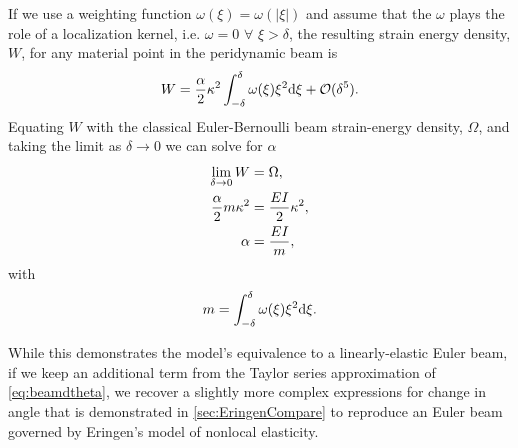 %
If we use a weighting function \(\omega(\xi)=\omega(|\xi|)\) and assume that the $\omega$ plays the role of a localization kernel, i.e. $\omega = 0 \,\, \forall \,\, \xi > \delta$, the resulting strain energy density, $W$, for any material point in the peridynamic beam is
%
\begin{equation}
W = \frac{\alpha}{2}\kappa^2 \int_{-\delta}^\delta \omega(\xi)\xi^2 {\rm d}\xi + \mathcal{O}(\delta^5).\notag
\end{equation}
%
Equating $W$ with the classical Euler-Bernoulli beam strain-energy density, $\Omega$, and taking the limit as $\delta \to 0$ we can solve for $\alpha$
%
\begin{align}
    \lim_{\delta \to 0}  W &= \Omega, \notag \\
    \frac{\alpha}{2} m \kappa^2 &= \frac{EI}{2} \kappa^2, \notag \\
    \alpha &= \frac{EI}{m},
\label{eq:alpha}
\end{align}
%
with 
\begin{equation}
    m = \int_{-\delta}^{\delta} \omega(\xi) \xi^2 {\rm d}\xi \notag.
\end{equation}

While this demonstrates the model's equivalence to a linearly-elastic Euler beam, if we keep an additional term from the Taylor series approximation of \cref{eq:beamdtheta}, we recover a slightly more complex expressions for change in angle that is demonstrated in \ref{sec:EringenCompare} to reproduce an Euler beam governed by Eringen's model of nonlocal elasticity.

